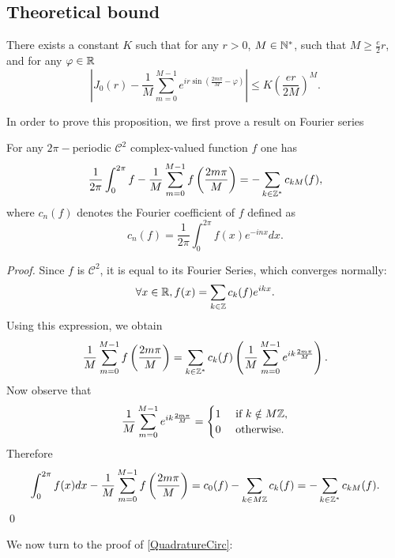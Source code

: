 \documentclass[smallextended]{svjour3}
\begin{document}
\subsection{Theoretical bound}
\begin{theorem} There exists a constant $K$ such that for any $r>0$, $M\in \mathbb{N}^*$, such that $M \geq \frac{e}{2}r$, and for any $\varphi \in \mathbb{R}$ 
	\[\left|J_0(r) -  \dfrac{1}{M}\sum_{m=0}^{M-1}e^{ir\sin\left(\frac{2m\pi}{M}-\varphi\right)} \right| \leq K \left(\dfrac{er}{2M}\right)^M.\]
	\label{QuadratureCirc}
\end{theorem}
\noindent In order to prove this proposition, we first prove a result on Fourier series
\begin{lemma} For any $2\pi-$periodic $\mathcal{C}^2$ complex-valued function $f$ one has 
	\[\dfrac{1}{2\pi}\int_{0}^{2\pi}f - \dfrac{1}{M}\sum_{m=0}^{M-1}f\left(\frac{2m\pi}{M} \right) = - \sum\limits_{k \in \mathbb{Z}^*}c_{kM}(f),\]
	where $c_n(f)$ denotes the Fourier coefficient of $f$ defined as 
	\[c_n(f) = \dfrac{1}{2\pi}\int_{0}^{2\pi}f(x)e^{-inx}dx.\]
\end{lemma}
\begin{proof}
	Since $f$ is $\mathcal{C}^2$, it is equal to its Fourier Series, which converges normally: \[\forall x \in \mathbb{R}, f(x) = \sum_{k\in\mathbb{Z}} c_k(f)e^{ikx}.\] Using this expression, we obtain \[\dfrac{1}{M}\sum_{m=0}^{M-1}f\left(\frac{2m\pi}{M}\right) = \sum\limits_{k\in \mathbb{Z}^*}c_k(f)\left(\frac{1}{M}\sum_{m=0}^{M-1}e^{ik\frac{2m\pi}{M}}\right).\] 
	Now observe that
	\[\dfrac{1}{M}\sum_{m=0}^{M-1}e^{ik\frac{2m\pi}{M}} =   \begin{cases}
	1 &\text{ if } k \notin M\mathbb{Z}, \\
	0 &\text{ otherwise.}
	\end{cases}\] 
	Therefore \[\int_{0}^{2\pi}f(x)dx - \dfrac{1}{M}\sum_{m=0}^{M-1}f\left(\frac{2m\pi}{M} \right) = c_0(f) - \sum\limits_{k \in M\mathbb{Z}}c_{k}(f) = - \sum\limits_{k \in \mathbb{Z}^*}c_{kM}(f).\]
	\qed
\end{proof}
\noindent We now turn to the proof of \autoref{QuadratureCirc}: 
\end{document}
